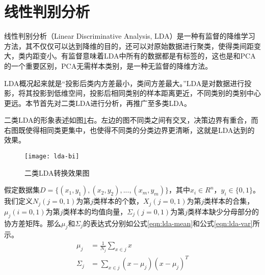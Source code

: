 \section{线性判别分析}
线性判别分析（Linear Discriminative Analysis, LDA）是一种有监督的降维学习方法，其不仅仅可以达到降维的目的，还可以对原始数据进行聚类，使得类间距变大，类内距变小。有监督意味着LDA中所有的数据都是有标签的，这也是和PCA的一个重要区别，PCA无需样本类别，是一种无监督的降维方法。

LDA概况起来就是“投影后类内方差最小，类间方差最大。”LDA是对数据进行投影，将其投影到低维空间，投影后相同类别的样本距离更近，不同类别的类别中心更远。本节首先对二类LDA进行分析，再推广至多类LDA。

二类LDA的形象表述如图\ref{fig:lda-bi}右。左边的图不同类之间有交叉，决策边界有重合，而右图既使得相同类更集中，也使得不同类的分类边界更清晰，这就是LDA达到的效果。
\begin{figure}[htbp]
  \centering
  \texttt{[image: lda-bi]}
  \caption{二类LDA转换效果图 \label{fig:lda-bi}}
\end{figure}

假定数据集$D=\{(x_1, y_1), (x_2, y_2), ..., (x_m, y_m)\}$，其中$x_i \in R^{n}$，$y_i \in \{0, 1\}$。我们定义$N_j (j=0,1)$为第$j$类样本的个数，$X_j (j=0,1)$为第$j$类样本的合集，$\mu_j (i=0,1)$为第$j$类样本的均值向量，$\Sigma_j (j=0,1)$为第$j$类样本缺少分母部分的协方差矩阵。那么$\mu_j$和$\Sigma_j$的表达式分别如公式\ref{eqn:lda-mean}和公式\ref{eqn:lda-var}所示。
\begin{align}
\mu_j &= \frac{1}{N_j} \sum_{x\in{j}} x  \label{eqn:lda-mean}\\
\Sigma_j &= \sum_{x\in{j}} (x-\mu_{j})(x-\mu_{j})^{T} \label{eqn:lda-var}
\end{align}


